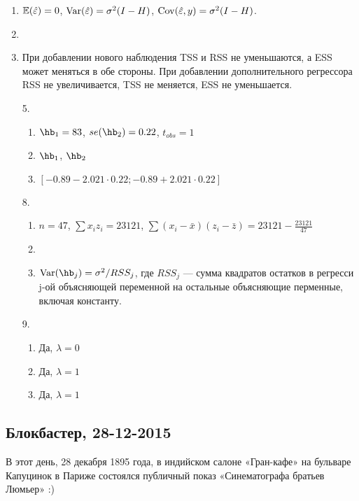 \documentclass[12pt, a4paper]{article}
\theoremstyle{definition}
\begin{document}
\begin{enumerate}
\item $\mathbb{E}(\hat{\varepsilon}) = 0$, $\operatorname{Var}(\hat{\varepsilon}) = \sigma^2 (I - H)$, $\operatorname{Cov}(\hat{\varepsilon}, y) =  \sigma^2 (I - H)$.
\item
\item При добавлении нового наблюдения TSS и RSS не уменьшаются, а ESS может меняться в обе стороны.
При добавлении дополнительного регрессора RSS не увеличивается, TSS не меняется, ESS не уменьшается.
\item[5.]
\begin{enumerate}
\item $\hb_1 = 83$, $se(\hb_2) = 0.22$, $t_{obs} = 1$
\item $\hb_1$, $\hb_2$
\item $[-0.89  - 2.021 \cdot 0.22; -0.89 + 2.021 \cdot 0.22]$
\end{enumerate}
\item[8.]
\begin{enumerate}
\item $n=47$, $\sum x_iz_i = 23121$, $\sum(x_i-\bar{x})(z_i-\bar{z}) = 23121 - \frac{23121}{47}$
\item
\item $\Var(\hb_j) = \sigma^2/RSS_j$, где $RSS_j$ — сумма квадратов остатков в регресси j-ой объясняющей переменной на остальные объясняющие перменные, включая константу.
\end{enumerate}
\item[9.]
\begin{enumerate}
\item Да, $\lambda=0$
\item Да, $\lambda=1$
\item Да, $\lambda=1$
\end{enumerate}
\end{enumerate}

\subsection{Блокбастер, 28-12-2015}

В этот день, 28 декабря 1895 года, в индийском салоне «Гран-кафе» на бульваре Капуцинок в Париже состоялся публичный показ «Синематографа братьев Люмьер» :)
\end{document}
